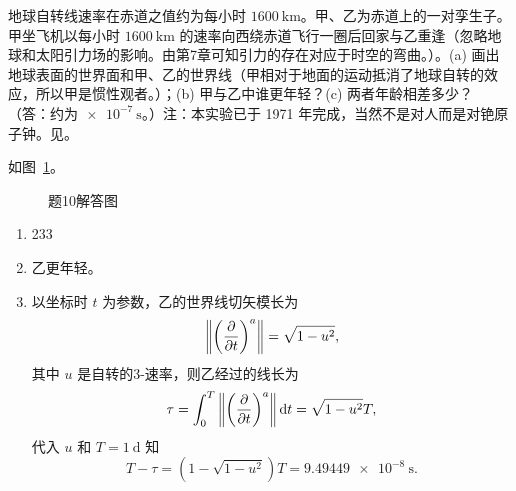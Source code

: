 \begin{xiti}
	\item 地球自转线速率在赤道之值约为每小时 $\SI{1600}{\kilo\metre}$。甲、乙为赤道上的一对孪生子。甲坐飞机以每小时 $\SI{1600}{\kilo\metre}$ 的速率向西绕赤道飞行一圈后回家与乙重逢（忽略地球和太阳引力场的影响。由第7章可知引力的存在对应于时空的弯曲。）。(a) 画出地球表面的世界面和甲、乙的世界线（甲相对于地面的运动抵消了地球自转的效应，所以甲是惯性观者。）；(b) 甲与乙中谁更年轻？(c) 两者年龄相差多少？（答：约为$\SI{e-7}{\second}$。）注：本实验已于 1971 年完成，当然不是对人而是对铯原子钟。见\cite{Hafele166}。
	
		\begin{jie}
			如图~\ref{pic-6.10}。
			\begin{figure}[htb!]
				\centering
				\caption{题10解答图}\label{pic-6.10}
			\end{figure}
			\begin{enumerate}[label=(\alph*)]
				\item 233
				\item 乙更年轻。
				\item 以坐标时 $t$ 为参数，乙的世界线切矢模长为
				\begin{equation*}
					\norm{\tensor{\left( \pdv{t} \right)}{^a}} = \sqrt{1-u^2},
				\end{equation*}
				其中 $u$ 是自转的3-速率，则乙经过的线长为
				\begin{equation*}
					\tau = \int_0^T \norm{\tensor{\left( \pdv{t} \right)}{^a}} \dd{t} = \sqrt{1-u^2} T,
				\end{equation*}
				代入 $u$ 和 $T=\SI{1}{\day}$ 知
				\begin{equation*}
					T-\tau=\left( 1- \sqrt{1-u^2} \right) T = \SI{9.49449e-8}{\second}.
				\end{equation*}
			\end{enumerate}
		\end{jie}


\end{xiti}
